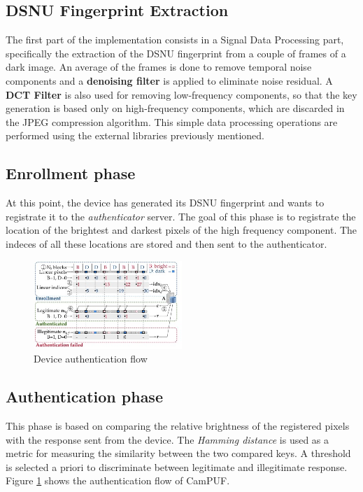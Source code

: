 \subsection{\textbf{DSNU Fingerprint Extraction}}
The first part of the implementation consists in a Signal Data Processing part, specifically the extraction of the DSNU fingerprint from a couple of frames of a dark image. 
An average of the frames is done to remove temporal noise components and a \textbf{denoising filter} is applied to eliminate noise residual.
A \textbf{DCT Filter} is also used for removing low-frequency components, so that the key generation is based only on high-frequency components, which are discarded in the JPEG compression algorithm.
This simple data processing operations are performed using the external libraries previously mentioned.

\subsection{\textbf{Enrollment phase}}
At this point, the device has generated its DSNU fingerprint and wants to registrate it to the \textit{authenticator} server.
The goal of this phase is to registrate the location of the brightest and darkest pixels of the high frequency component. The indeces of all these locations are stored
and then sent to the authenticator.
\begin{figure}[h!]    
    \centering
    \includegraphics[width=0.5\textwidth]{images/device_auth_flow.jpg}
    \caption{Device authentication flow}
    \label{fig:authflow}
\end{figure}
\subsection{\textbf{Authentication phase}}
This phase is based on comparing the relative brightness of the registered pixels with the response sent from the device. The \textit{Hamming distance} is used as a
metric for measuring the similarity between the two compared keys. A threshold is selected a priori to discriminate between legitimate and illegitimate response.
\\
Figure \ref{fig:authflow} shows the authentication flow of CamPUF.








